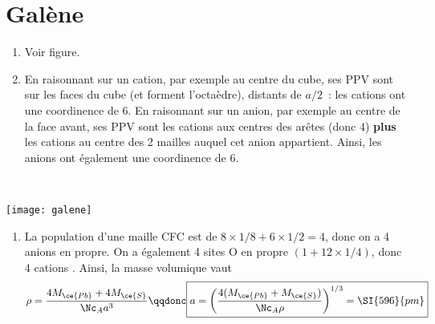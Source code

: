 \documentclass[a4paper, 12pt, final, garamond]{book}
\begin{document}
\section{Galène}
\noindent
\begin{minipage}[t]{.6\linewidth}
  \begin{enumerate}
    \item Voir figure.
    \item En raisonnant sur un cation, par exemple au centre du cube, ses PPV sont
      sur les faces du cube (et forment l'octaèdre), distants de $a/2$~: les
      cations ont une coordinence de 6. \smallbreak
      En raisonnant sur un anion, par exemple au centre de la face avant, ses PPV
      sont les cations aux centres des arêtes (donc 4) \textbf{plus} les cations
      au centre des 2 mailles auquel cet anion appartient. Ainsi, les anions ont
      également une coordinence de 6.
  \end{enumerate}
\end{minipage}
\hfill
\begin{minipage}[t]{.3\linewidth}
  ~
  \begin{center}
      \vspace*{-10pt}
      \texttt{[image: galene]}
      \label{fig:gal}
  \end{center}
  
\end{minipage}
\begin{enumerate}[resume]
  \item La population d'une maille CFC est de $8\times1/8+6\times1/2=4$, donc on
    a 4 anions  en propre. On a également 4 sites O en propre
    $(1+12\times1/4)$, donc 4 cations . Ainsi, la masse volumique
    vaut
    \[
      \rho = \frac{4M_{\ce{Pb}} + 4M_{\ce{S}}}{\Nc_A a^3}
      \qqdonc
      \boxed{a = \left( \frac{4(M_{\ce{Pb}} + M_{\ce{S}})}{\Nc_A\rho}
      \right)^{1/3} = \SI{596}{pm}}
    \]
\end{enumerate}
\end{document}
